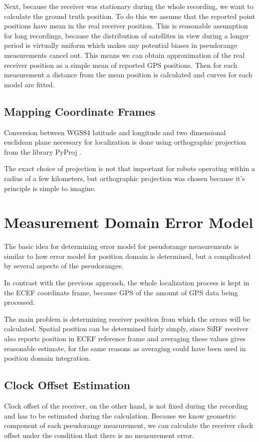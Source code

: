 Next, because the receiver was stationary during the whole recording, we want to
calculate the ground truth position.
To do this we assume that the reported point positions have mean in the real receiver position.
This is reasonable assumption for long recordings,
because the distribution of satellites in view during a longer period is
virtually uniform which makes any potential biases in pseudorange measurements
cancel out.
This means we can obtain approximation of the real receiver position as a simple
mean of reported GPS positions.
Then for each measurement a distance from the mean position is calculated and
curves for each model are fitted.

\subsection{Mapping Coordinate Frames}
\label{sec:impl-coordinates}
Conversion between WGS84 latitude and longitude and two dimensional euclidean
plane necessary for localization is done using orthographic projection from
the library PyProj \cite{www-pyproj}.

The exact choice of projection is not that important for robots operating within
a radius of a few kilometers, but orthographic projection was chosen because
it's principle is simple to imagine.

\section{Measurement Domain Error Model}
The basic idea for determining error model for pseudorange measurements is
similar to how error model for position domain is determined, but a complicated
by several aspects of the pseudoranges.

In contrast with the previous approach, the whole localization process is kept in
the ECEF coordinate frame, because GPS of the amount of GPS data being processed.

The main problem is determining receiver position from which the errors will be
calculated.
Spatial position can be determined fairly simply, since SiRF receiver also
reports position in ECEF reference frame and averaging these values gives
reasonable estimate, for the same reasons as averaging could have been used in
position domain integration.

\subsection{Clock Offset Estimation}
\label{sec:impl-clock-offsets}
Clock offset of the receiver, on the other hand, is not fixed during the recording
and has to be estimated during the calculation.
Because we know geometric component of each pseudorange measurement, we can
calculate the receiver clock offset under the condition that there is no measurement
error.

